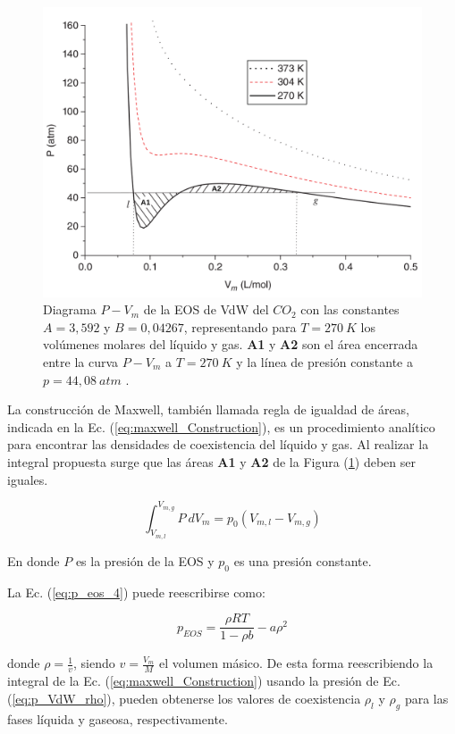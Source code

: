 \begin{figure}[htbp]
	\centering
	\includegraphics[width=.8\textwidth]{figs/cap4/Diagrama_P_V_del_CO2_Multiphase_LBM}
	\caption{Diagrama $P - V_m$ de la EOS de VdW del $CO_2$ con las constantes $A = 3,592$ y $B = 0,04267$, representando para $T = 270 \> K$ los volúmenes molares del líquido y gas. \textbf{A1} y \textbf{A2} son el área encerrada entre la curva $P - V_m$ a $T = 270 \> K$ y la línea de presión constante a  $p = 44,08 \> atm$ \cite{huang2015multiphase}.}
	\label{fig:P_V_CO2}	
\end{figure}

La construcción de Maxwell, también llamada regla de igualdad de áreas, indicada en la Ec. (\ref{eq:maxwell_Construction}), es un procedimiento analítico para encontrar las densidades de coexistencia del líquido y gas. Al realizar la integral propuesta surge que las áreas \textbf{A1} y \textbf{A2} de la Figura (\ref{fig:P_V_CO2}) deben ser iguales.

\begin{equation}
\int_{V_{m,l}}^{V_{m,g}} P \> d V_m = p_0 (V_{m,l} -  V_{m,g})
\label{eq:maxwell_Construction}
\end{equation}

En donde $P$ es la presión de la EOS y $p_0$ es una presión constante.

La Ec. (\ref{eq:p_eos_4}) puede reescribirse como:

\begin{equation}
	p_{EOS} = \frac{\rho R T}{1- \rho b} - a {\rho}^{2} 
	\label{eq:p_VdW_rho}
\end{equation}

donde $\rho = \frac{1}{v}$, siendo $v = \frac{V_m}{M}$ el volumen másico. De esta forma reescribiendo la integral de la Ec. (\ref{eq:maxwell_Construction}) usando la presión de Ec. (\ref{eq:p_VdW_rho}), pueden obtenerse los valores de coexistencia $\rho_l$ y $\rho_g$ para las fases líquida y gaseosa, respectivamente. 


